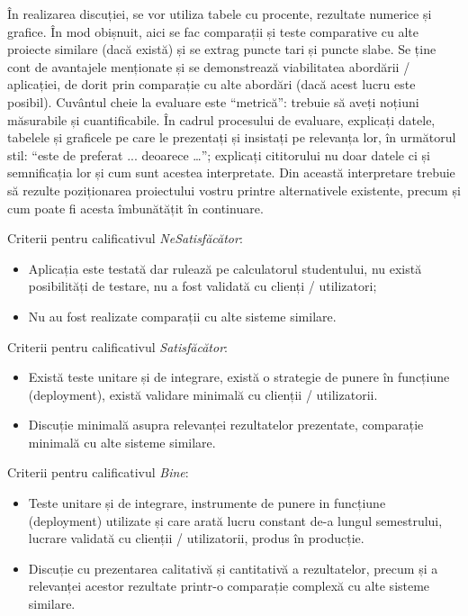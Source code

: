\documentclass[12pt,a4paper]{report}
\newcommand{\worktype}[1]{[\textit{#1}] }
\newcommand{\dezvoltare}{\worktype{Dezvoltare de produs}}
\newcommand{\ambele}{\worktype{Ambele}}
\begin{document}
În realizarea discuției, se vor utiliza tabele cu procente, rezultate numerice și grafice. În mod obișnuit, aici se fac comparații și teste comparative cu alte proiecte similare (dacă există) și se extrag puncte tari și puncte slabe. Se ține cont de avantajele menționate și se demonstrează viabilitatea abordării / aplicației, de dorit prin comparație cu alte abordări (dacă acest lucru este posibil). Cuvântul cheie la evaluare este ``metrică'': trebuie să aveți noțiuni măsurabile și cuantificabile. În cadrul procesului de evaluare, explicați datele, tabelele și graficele pe care le prezentați și insistați pe relevanța lor, în următorul stil: ``este de preferat ... deoarece …''; explicați cititorului nu doar datele ci și semnificația lor și cum sunt acestea interpretate. Din această interpretare trebuie să rezulte poziționarea proiectului vostru printre alternativele existente, precum și cum poate fi acesta îmbunătățit în continuare.

Criterii pentru calificativul \textit{Ne\textit{Satisfăcător}}: 
\begin{itemize}
	\item Aplicația este testată dar rulează pe calculatorul studentului, nu există posibilități de testare, nu a fost validată cu clienți / utilizatori;
	\item Nu au fost realizate comparații cu alte sisteme similare.
\end{itemize}

Criterii pentru calificativul \textit{Satisfăcător}: 
\begin{itemize}
	\item \dezvoltare  Există teste unitare și de integrare, există o strategie de punere în funcțiune (deployment), există validare minimală cu clienții / utilizatorii.
	\item \ambele Discuție minimală asupra relevanței rezultatelor prezentate, comparație minimală cu alte sisteme similare.
\end{itemize}

Criterii pentru calificativul \textit{Bine}: 
\begin{itemize}
	\item \dezvoltare Teste unitare și de integrare, instrumente de punere in funcțiune (deployment) utilizate și care arată lucru constant de-a lungul semestrului, lucrare validată cu clienții / utilizatorii, produs în producție.
	\item \ambele Discuție cu prezentarea calitativă și cantitativă a rezultatelor, precum și a relevanței acestor rezultate printr-o comparație complexă cu alte sisteme similare.
\end{itemize}
\end{document}
